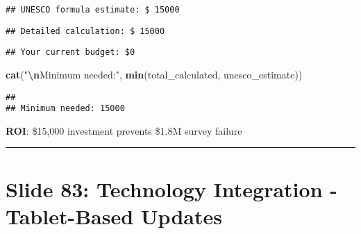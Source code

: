 \documentclass[
]{article}
\newenvironment{Shaded}{\begin{snugshade}}{\end{snugshade}}
\newcommand{\FunctionTok}[1]{\textcolor[rgb]{0.13,0.29,0.53}{\textbf{#1}}}
\newcommand{\NormalTok}[1]{#1}
\newcommand{\SpecialCharTok}[1]{\textcolor[rgb]{0.81,0.36,0.00}{\textbf{#1}}}
\newcommand{\StringTok}[1]{\textcolor[rgb]{0.31,0.60,0.02}{#1}}
\begin{document}
\begin{verbatim}
## UNESCO formula estimate: $ 15000
\end{verbatim}

\begin{Shaded}
\end{Shaded}

\begin{verbatim}
## Detailed calculation: $ 15000
\end{verbatim}

\begin{Shaded}
\end{Shaded}

\begin{verbatim}
## Your current budget: $0
\end{verbatim}

\begin{Shaded}
\begin{Highlighting}[]
\FunctionTok{cat}\NormalTok{(}\StringTok{"}\SpecialCharTok{\textbackslash{}n}\StringTok{Minimum needed:"}\NormalTok{, }\FunctionTok{min}\NormalTok{(total\_calculated, unesco\_estimate))}
\end{Highlighting}
\end{Shaded}

\begin{verbatim}
## 
## Minimum needed: 15000
\end{verbatim}

\textbf{ROI}: \$15,000 investment prevents \$1.8M survey failure

\begin{center}\rule{0.5\linewidth}{0.5pt}\end{center}

\section{Slide 83: Technology Integration - Tablet-Based
Updates}\label{slide-83-technology-integration---tablet-based-updates}
\end{document}

